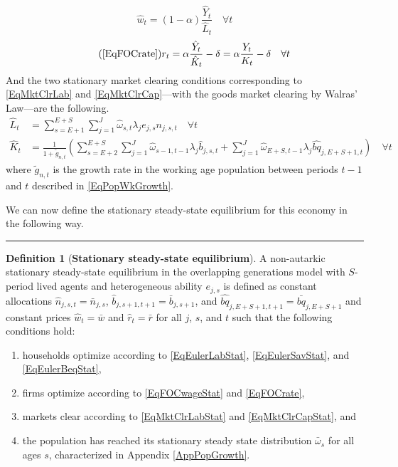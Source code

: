 \documentclass[letterpaper,12pt]{article}
\theoremstyle{definition}
\newtheorem{definition}{Definition} %
\begin{document}
\begin{spacing}{1.5}
    \begin{equation}\label{EqFOCwageStat}
       \hat{w}_t = (1-\alpha)\frac{\hat{Y}_t}{\hat{L}_t} \quad \forall t
    \end{equation}
    \begin{equation}\tag{\ref{EqFOCrate}}
       r_t = \alpha\frac{\hat{Y}_t}{\hat{K}_t} - \delta = \alpha\frac{Y_t}{K_t} - \delta \quad \forall t
    \end{equation}
    And the two stationary market clearing conditions corresponding to \eqref{EqMktClrLab} and \eqref{EqMktClrCap}---with the goods market clearing by Walras' Law---are the following.
    \begin{align}
      \hat{L}_t &= \sum_{s=E+1}^{E+S}\sum_{j=1}^{J} \hat{\omega}_{s,t}\lambda_j e_{j,s}n_{j,s,t} \quad \forall t \label{EqMktClrLabStat} \\
      \hat{K}_t &= \frac{1}{1 + \tilde{g}_{n,t}}\left(\sum_{s=E+2}^{E+S}\sum_{j=1}^{J}\hat{\omega}_{s-1,t-1}\lambda_j \hat{b}_{j,s,t} + \sum_{j=1}^{J}\hat{\omega}_{E+S,t-1}\lambda_j \hat{bq}_{j,E+S+1,t}\right) \quad \forall t \label{EqMktClrCapStat}
    \end{align}
    where $\tilde{g}_{n,t}$ is the growth rate in the working age population between periods $t-1$ and $t$ described in \eqref{EqPopWkGrowth}.

    We can now define the stationary steady-state equilibrium for this economy in the following way.

    \vspace{7mm}
    \end{spacing}
    \hrule
    \begin{definition}[\textbf{Stationary steady-state equilibrium}]\label{DefEquilSS}
      A non-autarkic stationary steady-state equilibrium in the overlapping generations model with $S$-period lived agents and heterogeneous ability $e_{j,s}$ is defined as constant allocations $\hat{n}_{j,s,t}=\bar{n}_{j,s}$, $\hat{b}_{j,s+1,t+1}=\bar{b}_{j,s+1}$, and $\hat{bq}_{j,E+S+1,t+1}=\bar{bq}_{j,E+S+1}$ and constant prices $\hat{w}_t=\bar{w}$ and $\hat{r}_t=\bar{r}$ for all $j$, $s$, and $t$ such that the following conditions hold:
       \begin{enumerate}
          \item households optimize according to \eqref{EqEulerLabStat}, \eqref{EqEulerSavStat}, and \eqref{EqEulerBeqStat},
          \item firms optimize according to \eqref{EqFOCwageStat} and \eqref{EqFOCrate},
          \item markets clear according to \eqref{EqMktClrLabStat} and \eqref{EqMktClrCapStat}, and
          \item the population has reached its stationary steady state distribution $\bar{\omega}_s$ for all ages $s$, characterized in Appendix \ref{AppPopGrowth}.
       \end{enumerate}
    \end{definition}
\end{document}
